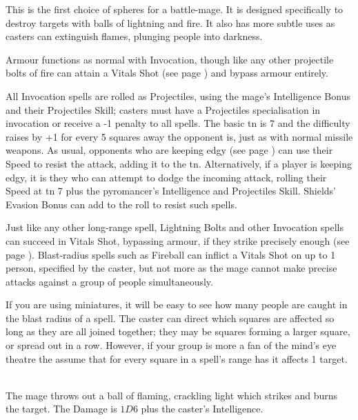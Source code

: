 \documentclass[titlepage,a4paper,openany]{book}
\begin{document}

\begin{multicols}{2}

This is the first choice of spheres for a battle-mage. It is designed specifically to destroy targets with balls of lightning and fire. It also has more subtle uses as casters can extinguish flames, plunging people into darkness.

Armour functions as normal with Invocation, though like any other projectile bolts of fire can attain a Vitals Shot (see page \pageref{vitals}) and bypass armour entirely.

All Invocation spells are rolled as Projectiles, using the mage's Intelligence Bonus and their Projectiles Skill; casters must have a Projectiles specialisation in invocation or receive a -1 penalty to all spells. The basic \gls{tn} is 7 and the difficulty raises by +1 for every 5 squares away the opponent is, just as with normal missile weapons. As usual, opponents who are keeping edgy (see page \pageref{edgy}) can use their Speed to resist the attack, adding it to the \gls{tn}. Alternatively, if a player is keeping edgy, it is they who can attempt to dodge the incoming attack, rolling their Speed at \gls{tn} 7 plus the pyromancer's Intelligence and Projectiles Skill. Shields' Evasion Bonus can add to the roll to resist such spells.

Just like any other long-range spell, Lightning Bolts and other Invocation spells can succeed in Vitals Shot, bypassing armour, if they strike precisely enough (see page \pageref{vitals}). Blast-radius spells such as Fireball can inflict a Vitals Shot on up to 1 person, specified by the caster, but not more as the mage cannot make precise attacks against a group of people simultaneously.

If you are using miniatures, it will be easy to see how many people are caught in the blast radius of a spell. The caster can direct which squares are affected so long as they are all joined together; they may be squares forming a larger square, or spread out in a row. However, if your group is more a fan of the mind's eye theatre the assume that for every square in a spell's range has it affects 1 target.

\spelllevel

\\
The mage throws out a ball of flaming, crackling light which strikes and burns the target. The Damage is $1D6$ plus the caster's Intelligence.


\end{multicols}
\end{document}

